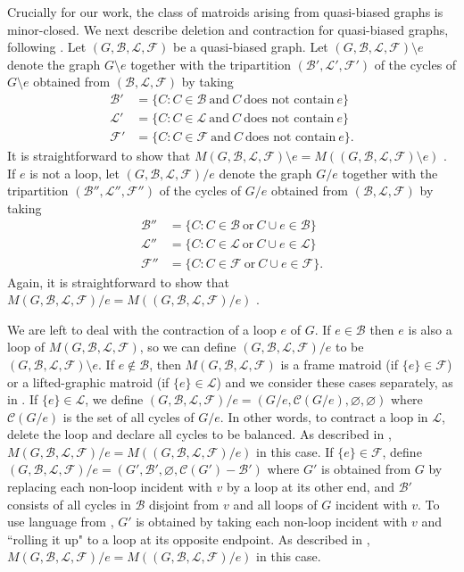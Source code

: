 \documentclass[12pt]{article}
\theoremstyle{definition}
\theoremstyle{plain} %
\newcommand{\cB}{\mathcal{B}}
\newcommand{\cC}{\mathcal{C}}
\newcommand{\cF}{\mathcal{F}}
\newcommand{\cL}{\mathcal{L}}
\newcommand{\del}{\!\setminus\!}
\begin{document}
Crucially for our work, the class of matroids arising from quasi-biased graphs is minor-closed. 
We next describe deletion and contraction for quasi-biased graphs, following \cite{Bowler-Funk-Slilaty20}. 
Let $(G,\cB,\cL,\cF)$ be a quasi-biased graph. 
Let $(G,\cB,\cL,\cF)\del e$ denote the graph $G\del e$ together with the tripartition $(\cB',\cL',\cF')$ of the cycles of $G \del e$ obtained from $(\cB,\cL,\cF)$ by taking
\begin{align*}
    \cB' &= \{C : C \in \cB \ \text{and} \ C \ \text{does not contain} \ e\} \\
    \cL' &= \{C : C \in \cL \ \text{and} \ C \ \text{does not contain} \ e\} \\
    \cF' &= \{C : C \in \cF \ \text{and} \ C \ \text{does not contain} \ e\}.
\end{align*}
It is straightforward to show that $M(G, \cB, \cL, \cF) \del e = M((G, \cB, \cL, \cF) \del e)$ \cite[Theorem 4.5]{Bowler-Funk-Slilaty20}.
If $e$ is not a loop, let $(G,\cB,\cL,\cF)/e$ denote the graph $G/e$ together with the tripartition $(\cB'',\cL'',\cF'')$ of the cycles of $G/e$ obtained from $(\cB,\cL,\cF)$ by taking
\begin{align*}
    \cB'' &= \{C : C \in \cB \ \text{or} \ C \cup e \in \cB\} \\
    \cL'' &= \{C : C \in \cL \ \text{or} \ C \cup e \in \cL\} \\
    \cF'' &= \{C : C \in \cF \ \text{or} \ C \cup e \in \cF\}.
\end{align*}
Again, it is straightforward to show that $M(G, \cB, \cL, \cF)/e = M((G, \cB, \cL, \cF)/e)$ \cite[Theorem 4.5]{Bowler-Funk-Slilaty20}.

We are left to deal with the contraction of a loop $e$ of $G$.
If $e \in \cB$ then $e$ is also a loop of $M(G, \cB, \cL, \cF)$, so we can define $(G, \cB, \cL, \cF)/e$ to be $(G, \cB, \cL, \cF) \del e$.
If $e \notin \cB$, then $M(G,\cB, \cL, \cF)$ is a frame matroid (if $\{e\} \in \cF$) or a lifted-graphic matroid (if $\{e\} \in \cL$) and we consider these cases separately, as in \cite{Funk-Pivotto-Slilaty22}.
If $\{e\} \in \cL$, we define $(G, \cB, \cL, \cF)/e = (G/e, \cC(G/e), \varnothing, \varnothing)$ where $\cC(G/e)$ is the set of all cycles of $G/e$.
In other words, to contract a loop in $\cL$, delete the loop and declare all cycles to be balanced.
As described in \cite[page 9]{Funk-Pivotto-Slilaty22}, $M(G, \cB, \cL, \cF)/e = M((G, \cB, \cL, \cF)/e)$ in this case.
If $\{e\} \in \cF$, define $(G,\cB, \cL, \cF) / e = (G', \cB', \varnothing, \cC(G') - \cB')$ where $G'$ is obtained from $G$ by replacing each non-loop incident with $v$ by a loop at its other end, and $\cB'$ consists of all cycles in $\cB$ disjoint from $v$ and all loops of $G$ incident with $v$.
To use language from \cite{Funk-Pivotto-Slilaty22}, $G'$ is obtained by taking each non-loop incident with $v$ and ``rolling it up" to a loop at its opposite endpoint. 
As described in \cite[page 9]{Funk-Pivotto-Slilaty22}, $M(G, \cB, \cL, \cF)/e = M((G, \cB, \cL, \cF)/e)$ in this case.
\end{document}
